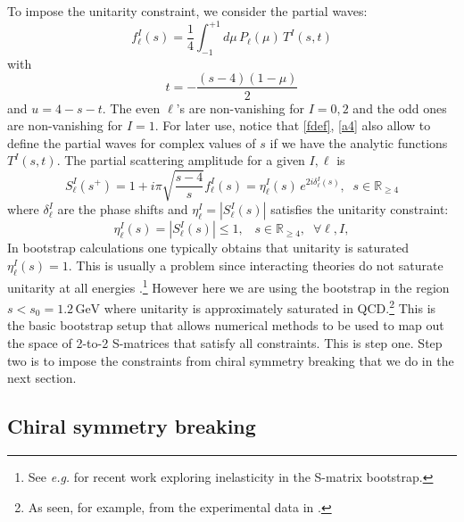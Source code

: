 \documentclass[12pt,letterpaper]{article}
\newcommand{\beq}{\begin{equation}}
\newcommand{\eeq}{\end{equation}}
\newcommand{\intP}{\ensuremath{\int_{-1}^{+1}\!\!\!\!\!\! d\mu\, P_\ell(\mu)\,}}
\newcommand{\GeV}{\ensuremath{\mbox{GeV}}}
\begin{document}
To impose the unitarity constraint, we consider the  partial waves:
\beq\label{fdef}
f^I_\ell(s) = \frac{1}{4} \intP T^I(s,t)
\eeq
with
\beq
	t = -\frac{(s-4)(1-\mu)}{2} \label{a4}	
\eeq
and $u=4-s-t$. The even $\ell$'s are non-vanishing for $I=0,2$ and the odd ones are non-vanishing for $I=1$. For later use, notice that \eqref{fdef}, \eqref{a4} also allow to define the partial waves for complex values of $s$ if we have the analytic functions $T^I(s,t)$. The partial scattering amplitude for a given $I,\ell$ is
\begin{equation}\label{h4}
	S_\ell^I(s^+)=1+i\pi\sqrt{\frac{s-4}{s}}f^I_\ell(s)=\eta^I_\ell(s)\, e^{2i\delta^I_{\ell}(s)},\;\; s\in\mathbb{R}_{\ge 4}
\end{equation}
where $\delta^{I}_\ell$ are the phase shifts and $\eta^I_\ell=|S^I_\ell(s)|$ satisfies the unitarity constraint:
\beq\label{uni}
 \eta^I_\ell(s) = |S^I_\ell(s)| \le 1,\;\;\; s\in\mathbb{R}_{\ge 4},\; \; \forall \ell, I, 
\eeq 
In bootstrap calculations one typically obtains that unitarity is saturated $\eta^I_\ell(s)=1$. This is usually a problem since interacting theories do not saturate unitarity at all energies \cite{Aks:1965qga}.\footnote{See {\it e.g.} \cite{Antunes:2023irg,Tourkine:2023xtu} for recent work exploring inelasticity in the S-matrix bootstrap.} However here we are using the bootstrap in the region $s<s_0=1.2\,\GeV$ where unitarity is approximately saturated in QCD.\footnote{As seen, for example, from the experimental data in \cite{Protopopescu:1973sh,LOSTY1974185,HYAMS1973134}.}
This is the basic bootstrap setup that allows numerical methods to be used to map out the space of 2-to-2 S-matrices that satisfy all constraints. This is step one. Step two is to impose the constraints from chiral symmetry breaking that we do in the next section. 

\subsection{Chiral symmetry breaking}\label{chibreak}
\end{document}
